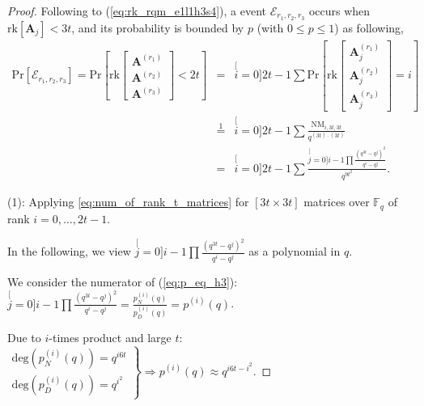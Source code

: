 \begin{proof}
Following to (\ref{eq:rk_rqm_e1l1h3s4}), a event $\mathcal{E}_{r_{1},r_{2},r_{3}}$
occurs when $\mathrm{rk}\left[\boldsymbol{A}_{j}\right]<3t$, and
its probability is bounded by $p$ (with $0\leq p\leq1$) as following,
\begin{eqnarray}
\mathrm{Pr}\left[\mathcal{E}_{r_{1},r_{2},r_{3}}\right]=\mathrm{Pr}\left[\mathrm{rk}\left[\begin{array}{c}
\boldsymbol{A}^{\left(r_{1}\right)}\\
\boldsymbol{A}^{\left(r_{2}\right)}\\
\boldsymbol{A}^{\left(r_{3}\right)}
\end{array}\right]<2t\right] & = & \stackrel[i=0]{2t-1}{\mathop{\sum}}\mathrm{Pr}\left[\mathrm{rk}\left[\begin{array}{c}
\boldsymbol{A}_{j}^{\left(r_{1}\right)}\\
\boldsymbol{A}_{j}^{\left(r_{2}\right)}\\
\boldsymbol{A}_{j}^{\left(r_{3}\right)}
\end{array}\right]=i\right]\label{eq:p_in_LLL}\\
 & \overset{1}{=} & \stackrel[i=0]{2t-1}{\mathop{\sum}}\frac{\mathrm{NM}_{i,3t,3t}}{q^{\left(3t\right)\cdot\left(3t\right)}}\nonumber \\
 & = & \stackrel[i=0]{2t-1}{\mathop{\sum}}\frac{\stackrel[j=0]{i-1}{\mathop{\prod}}\frac{\left(q^{3t}-q^{j}\right)^{2}}{q^{i}-q^{j}}}{q^{9t^{2}}}.\label{eq:p_eq_h3}
\end{eqnarray}

(1): Applying \ref{eq:num_of_rank_t_matrices} for $\left[3t\times3t\right]$
matrices over $\ensuremath{\mathbb{F}}_{q}$ of rank $i=0,\ldots,2t-1$.

In the following, we view $\stackrel[j=0]{i-1}{\mathop{\prod}}\frac{\left(q^{3t}-q^{j}\right)^{2}}{q^{i}-q^{j}}$
as a polynomial in $q$.

We consider the numerator of (\ref{eq:p_eq_h3}): $\stackrel[j=0]{i-1}{\mathop{\prod}}\frac{\left(q^{3t}-q^{j}\right)^{2}}{q^{i}-q^{j}}=\frac{p_{N}^{(i)}(q)}{p_{D}^{(i)}(q)}=p^{(i)}(q)$.

Due to $i$-times product and large $t$: $\left.\begin{array}{c}
\mathrm{deg}\left(p_{N}^{(i)}(q)\right)=q^{i6t}\\
\mathrm{deg}\left(p_{D}^{(i)}(q)\right)=q^{i^{2}}
\end{array}\right\} \Rightarrow p^{(i)}(q)\approx q^{i6t-i^{2}}$.


\end{proof}
